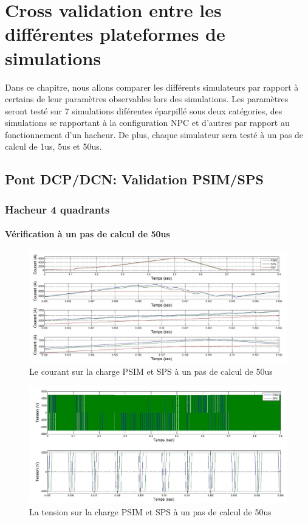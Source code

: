 \documentclass[11pt,letterpaper,final]{report}
\begin{document}
\chapter{Cross validation entre les différentes plateformes de simulations}
Dans ce chapitre, nous allons comparer les différents simulateurs par rapport à certains de leur paramètres observables lors des simulations. Les paramètres seront testé sur  7 simulations diférentes éparpillé sous deux catégories, des simulations se rapportant à la configuration NPC et d'autres par rapport au fonctionnement d'un hacheur. De plus, chaque simulateur sera testé à un pas de calcul de 1us, 5us et 50us.
\section{Pont DCP/DCN: Validation PSIM/SPS}
\subsection{Hacheur 4 quadrants}
\subsubsection{Vérification à un pas de calcul de 50us}


\begin{figure}[h!]
\centering
\includegraphics[scale=0.5]{Fig/Hacheur4Quadrants/HacheurCourantCharge50u.jpg}
\caption{Le courant sur la charge PSIM et SPS à un pas de calcul de 50us}
\label{comp_PSIM_SPS}
\end{figure}


\begin{figure}[h!]
\centering
\includegraphics[scale=0.5]{Fig/Hacheur4Quadrants/HacheurTensionCharge50u.jpg}
\caption{La tension sur la charge PSIM et SPS à un pas de calcul de 50us}
\label{err_cou}
\end{figure}
\end{document}
